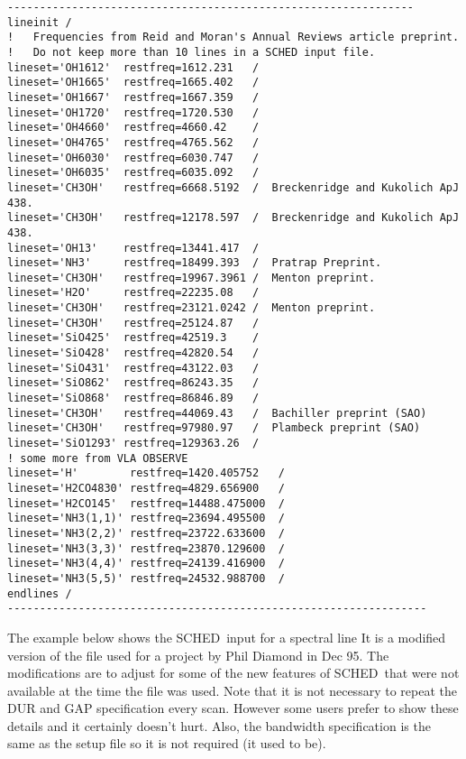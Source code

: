 \documentclass{report}
\newcommand{\schedb}{{\sc SCHED~}}
\begin{document}
\begin{verbatim}
---------------------------------------------------------------
lineinit /
!   Frequencies from Reid and Moran's Annual Reviews article preprint.
!   Do not keep more than 10 lines in a SCHED input file.
lineset='OH1612'  restfreq=1612.231   /
lineset='OH1665'  restfreq=1665.402   /
lineset='OH1667'  restfreq=1667.359   /
lineset='OH1720'  restfreq=1720.530   /
lineset='OH4660'  restfreq=4660.42    /
lineset='OH4765'  restfreq=4765.562   /
lineset='OH6030'  restfreq=6030.747   /
lineset='OH6035'  restfreq=6035.092   /
lineset='CH3OH'   restfreq=6668.5192  /  Breckenridge and Kukolich ApJ 438.
lineset='CH3OH'   restfreq=12178.597  /  Breckenridge and Kukolich ApJ 438.
lineset='OH13'    restfreq=13441.417  /
lineset='NH3'     restfreq=18499.393  /  Pratrap Preprint.
lineset='CH3OH'   restfreq=19967.3961 /  Menton preprint.
lineset='H2O'     restfreq=22235.08   /
lineset='CH3OH'   restfreq=23121.0242 /  Menton preprint.
lineset='CH3OH'   restfreq=25124.87   /
lineset='SiO425'  restfreq=42519.3    /
lineset='SiO428'  restfreq=42820.54   /
lineset='SiO431'  restfreq=43122.03   /
lineset='SiO862'  restfreq=86243.35   /
lineset='SiO868'  restfreq=86846.89   /
lineset='CH3OH'   restfreq=44069.43   /  Bachiller preprint (SAO)
lineset='CH3OH'   restfreq=97980.97   /  Plambeck preprint (SAO)
lineset='SiO1293' restfreq=129363.26  /
! some more from VLA OBSERVE
lineset='H'        restfreq=1420.405752   /
lineset='H2CO4830' restfreq=4829.656900   /
lineset='H2CO145'  restfreq=14488.475000  /
lineset='NH3(1,1)' restfreq=23694.495500  /
lineset='NH3(2,2)' restfreq=23722.633600  /
lineset='NH3(3,3)' restfreq=23870.129600  /
lineset='NH3(4,4)' restfreq=24139.416900  /
lineset='NH3(5,5)' restfreq=24532.988700  /
endlines /
-----------------------------------------------------------------
\end{verbatim}

The example below shows the \schedb input for a spectral line It is a
modified version of the file used for a project by Phil Diamond in Dec
95.  The modifications are to adjust for some of the new features of
\schedb that were not available at the time the file was used.  Note
that it is not necessary to repeat the DUR and GAP specification every
scan.  However some users prefer to show these details and it
certainly doesn't hurt.  Also, the bandwidth specification is the same
as the setup file so it is not required (it used to be).



\end{document}
